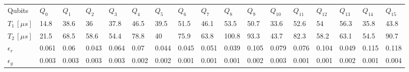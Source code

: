 \begin{tabular}{lllllllllllllllll}
\hline
 Qubits         & $Q_0$ & $Q_1$ & $Q_2$ & $Q_3$ & $Q_4$ & $Q_5$ & $Q_6$ & $Q_7$ & $Q_8$ & $Q_9$ & $Q_10$ & $Q_11$ & $Q_12$ & $Q_13$ & $Q_14$ & $Q_15$ \\
 $T_1\,[\mu s]$ & 14.8  & 38.6  & 36    & 37.8  & 46.5  & 39.5  & 51.5  & 46.1  & 53.5  & 50.7  & 33.6   & 52.6   & 54     & 56.3   & 35.8   & 43.8   \\
 $T_2\,[\mu s]$ & 21.5  & 68.5  & 58.6  & 54.4  & 78.8  & 40    & 75.9  & 63.8  & 100.8 & 93.3  & 43.7   & 82.3   & 58.2   & 63.1   & 54.5   & 90.7   \\
 $\epsilon_r$   & 0.061 & 0.06  & 0.043 & 0.064 & 0.07  & 0.044 & 0.045 & 0.051 & 0.039 & 0.105 & 0.079  & 0.076  & 0.104  & 0.049  & 0.115  & 0.118  \\
 $\epsilon_g$   & 0.003 & 0.003 & 0.003 & 0.003 & 0.002 & 0.002 & 0.001 & 0.001 & 0.001 & 0.002 & 0.003  & 0.001  & 0.001  & 0.002  & 0.001  & 0.004  \\
\hline
\end{tabular}
